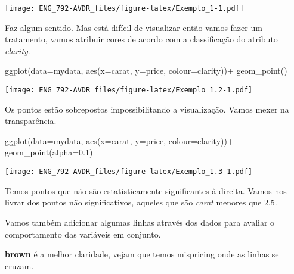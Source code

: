 \documentclass[
]{book}
\newenvironment{Shaded}{\begin{snugshade}}{\end{snugshade}}
\newcommand{\AttributeTok}[1]{\textcolor[rgb]{0.77,0.63,0.00}{#1}}
\newcommand{\FloatTok}[1]{\textcolor[rgb]{0.00,0.00,0.81}{#1}}
\newcommand{\FunctionTok}[1]{\textcolor[rgb]{0.00,0.00,0.00}{#1}}
\newcommand{\NormalTok}[1]{#1}
\newcommand{\SpecialCharTok}[1]{\textcolor[rgb]{0.00,0.00,0.00}{#1}}
\begin{document}
\texttt{[image: ENG\_792-AVDR\_files/figure-latex/Exemplo\_1-1.pdf]}

Faz algum sentido. Mas está difícil de visualizar então vamos fazer um tratamento, vamos atribuir cores de acordo com a classificação do atributo \emph{clarity}.

\begin{Shaded}
\begin{Highlighting}[]
\FunctionTok{ggplot}\NormalTok{(}\AttributeTok{data=}\NormalTok{mydata, }\FunctionTok{aes}\NormalTok{(}\AttributeTok{x=}\NormalTok{carat, }\AttributeTok{y=}\NormalTok{price, }\AttributeTok{colour=}\NormalTok{clarity))}\SpecialCharTok{+} 
  \FunctionTok{geom\_point}\NormalTok{()}
\end{Highlighting}
\end{Shaded}

\texttt{[image: ENG\_792-AVDR\_files/figure-latex/Exemplo\_1.2-1.pdf]}

Os pontos estão sobrepostos impossibilitando a visualização. Vamos mexer na transparência.

\begin{Shaded}
\begin{Highlighting}[]
\FunctionTok{ggplot}\NormalTok{(}\AttributeTok{data=}\NormalTok{mydata,}
       \FunctionTok{aes}\NormalTok{(}\AttributeTok{x=}\NormalTok{carat, }\AttributeTok{y=}\NormalTok{price, }\AttributeTok{colour=}\NormalTok{clarity))}\SpecialCharTok{+}
\FunctionTok{geom\_point}\NormalTok{(}\AttributeTok{alpha=}\FloatTok{0.1}\NormalTok{) }
\end{Highlighting}
\end{Shaded}

\texttt{[image: ENG\_792-AVDR\_files/figure-latex/Exemplo\_1.3-1.pdf]}

Temos pontos que não são estatisticamente significantes à direita. Vamos nos livrar dos pontos não significativos, aqueles que são \emph{carat} menores que 2.5.

Vamos também adicionar algumas linhas através dos dados para avaliar o comportamento das variáveis em conjunto.

\textbf{brown} é a melhor claridade, vejam que temos mispricing onde as linhas se cruzam.

\begin{Shaded}
\end{Shaded}
\end{document}
